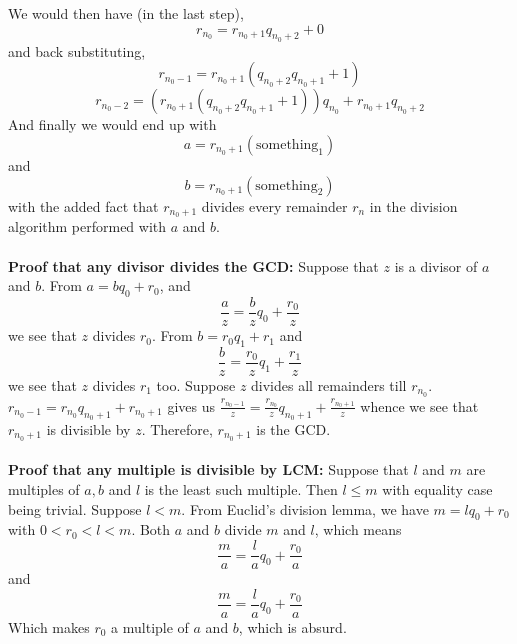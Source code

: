 \documentclass[../Main.tex]{subfiles}
\begin{document}
We would then have (in the last step), $$r_{n_0}=r_{n_0+1}q_{n_0+2}+0$$ and back substituting,
$$r_{n_0-1}=r_{n_0+1}(q_{n_0+2}q_{n_0+1}+1)$$
$$r_{n_0-2}=(r_{n_0+1}(q_{n_0+2}q_{n_0+1}+1))q_{n_0}+r_{n_0+1}q_{n_0+2} $$
And finally we would end up with $$a=r_{n_0+1}(\text{something}_1) $$
and $$b=r_{n_0+1}(\text{something}_2) $$ with the added fact that $r_{n_0+1}$ divides every remainder $r_n$ in the division algorithm performed with $a$ and $b$. 
\\\\ \textbf{Proof that any divisor divides the GCD:} Suppose that $z$ is a divisor of $a$ and $b$. 
From $a=bq_0+r_0$, and $$\frac{a}{z}=\frac{b}{z}q_0+\frac{r_0}{z} $$
we see that $z$ divides $r_0$. From $b=r_0q_1+r_1$ and $$\frac{b}{z}=\frac{r_0}{z}q_1+\frac{r_1}{z} $$
we see that $z$ divides $r_1$ too. Suppose $z$ divides all remainders till $r_{n_0}$. $r_{n_0-1}=r_{n_0}q_{n_0+1}+r_{n_0+1}$
gives us $\frac{r_{n_0-1}}{z}=\frac{r_{n_0}}{z}q_{n_0+1} +\frac{r_{n_0+1}}{z}$ whence we see that $r_{n_0+1}$ is 
divisible by $z$. Therefore, $r_{n_0+1}$ is the GCD.
\\\\ \textbf{Proof that any multiple is divisible by LCM:} Suppose that $l$ and $m$ are multiples of $a,b$ and $l$ is the least such multiple.
Then $l \leq m$ with equality case being trivial. Suppose $l<m$. From Euclid's division lemma, we have $m=lq_0+r_0$ with $0<r_0<l<m$. Both $a$ and $b$ divide $m$ and $l$, which means
$$\frac{m}{a}=\frac{l}{a}q_0+\frac{r_0}{a}$$ and $$\frac{m}{a}=\frac{l}{a}q_0+\frac{r_0}{a}$$ Which makes $r_0$ a multiple of $a$ and $b$, which is absurd.
\end{document}
